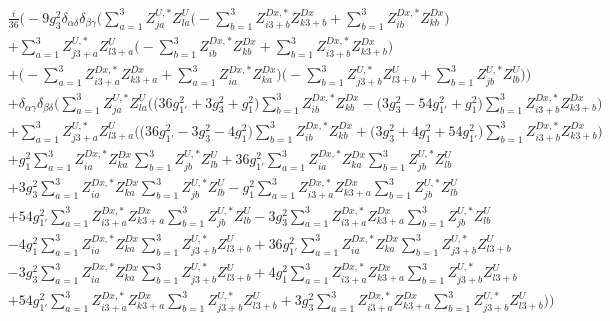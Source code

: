 \begin{align} 
 &\frac{i}{36} \Big(-9 g_{3}^{2} \delta_{\alpha \delta} \delta_{\beta \gamma} \Big(\sum_{a=1}^{3}Z^{U,*}_{j a} Z_{{l a}}^{U}  \Big(- \sum_{b=1}^{3}Z^{{Dx},*}_{i 3 + b} Z_{{k 3 + b}}^{Dx}   + \sum_{b=1}^{3}Z^{{Dx},*}_{i b} Z_{{k b}}^{Dx} \Big)\nonumber \\ 
 &+\sum_{a=1}^{3}Z^{U,*}_{j 3 + a} Z_{{l 3 + a}}^{U}  \Big(- \sum_{b=1}^{3}Z^{{Dx},*}_{i b} Z_{{k b}}^{Dx}   + \sum_{b=1}^{3}Z^{{Dx},*}_{i 3 + b} Z_{{k 3 + b}}^{Dx} \Big)\nonumber \\ 
 &+\Big(- \sum_{a=1}^{3}Z^{{Dx},*}_{i 3 + a} Z_{{k 3 + a}}^{Dx}   + \sum_{a=1}^{3}Z^{{Dx},*}_{i a} Z_{{k a}}^{Dx} \Big)\Big(- \sum_{b=1}^{3}Z^{U,*}_{j 3 + b} Z_{{l 3 + b}}^{U}   + \sum_{b=1}^{3}Z^{U,*}_{j b} Z_{{l b}}^{U} \Big)\Big)\nonumber \\ 
 &+\delta_{\alpha \gamma} \delta_{\beta \delta} \Big(\sum_{a=1}^{3}Z^{U,*}_{j a} Z_{{l a}}^{U}  \Big(\Big(36 g_{1'}^{2}  + 3 g_{3}^{2}  + g_{1}^{2}\Big)\sum_{b=1}^{3}Z^{{Dx},*}_{i b} Z_{{k b}}^{Dx}   - \Big(3 g_{3}^{2}  -54 g_{1'}^{2}  + g_{1}^{2}\Big)\sum_{b=1}^{3}Z^{{Dx},*}_{i 3 + b} Z_{{k 3 + b}}^{Dx}  \Big)\nonumber \\ 
 &+\sum_{a=1}^{3}Z^{U,*}_{j 3 + a} Z_{{l 3 + a}}^{U}  \Big(\Big(36 g_{1'}^{2}  -3 g_{3}^{2}  -4 g_{1}^{2} \Big)\sum_{b=1}^{3}Z^{{Dx},*}_{i b} Z_{{k b}}^{Dx}   + \Big(3 g_{3}^{2}  + 4 g_{1}^{2}  + 54 g_{1'}^{2} \Big)\sum_{b=1}^{3}Z^{{Dx},*}_{i 3 + b} Z_{{k 3 + b}}^{Dx}  \Big)\nonumber \\ 
 &+g_{1}^{2} \sum_{a=1}^{3}Z^{{Dx},*}_{i a} Z_{{k a}}^{Dx}  \sum_{b=1}^{3}Z^{U,*}_{j b} Z_{{l b}}^{U}  +36 g_{1'}^{2} \sum_{a=1}^{3}Z^{{Dx},*}_{i a} Z_{{k a}}^{Dx}  \sum_{b=1}^{3}Z^{U,*}_{j b} Z_{{l b}}^{U}  \nonumber \\ 
 &+3 g_{3}^{2} \sum_{a=1}^{3}Z^{{Dx},*}_{i a} Z_{{k a}}^{Dx}  \sum_{b=1}^{3}Z^{U,*}_{j b} Z_{{l b}}^{U}  - g_{1}^{2} \sum_{a=1}^{3}Z^{{Dx},*}_{i 3 + a} Z_{{k 3 + a}}^{Dx}  \sum_{b=1}^{3}Z^{U,*}_{j b} Z_{{l b}}^{U}  \nonumber \\ 
 &+54 g_{1'}^{2} \sum_{a=1}^{3}Z^{{Dx},*}_{i 3 + a} Z_{{k 3 + a}}^{Dx}  \sum_{b=1}^{3}Z^{U,*}_{j b} Z_{{l b}}^{U}  -3 g_{3}^{2} \sum_{a=1}^{3}Z^{{Dx},*}_{i 3 + a} Z_{{k 3 + a}}^{Dx}  \sum_{b=1}^{3}Z^{U,*}_{j b} Z_{{l b}}^{U}  \nonumber \\ 
 &-4 g_{1}^{2} \sum_{a=1}^{3}Z^{{Dx},*}_{i a} Z_{{k a}}^{Dx}  \sum_{b=1}^{3}Z^{U,*}_{j 3 + b} Z_{{l 3 + b}}^{U}  +36 g_{1'}^{2} \sum_{a=1}^{3}Z^{{Dx},*}_{i a} Z_{{k a}}^{Dx}  \sum_{b=1}^{3}Z^{U,*}_{j 3 + b} Z_{{l 3 + b}}^{U}  \nonumber \\ 
 &-3 g_{3}^{2} \sum_{a=1}^{3}Z^{{Dx},*}_{i a} Z_{{k a}}^{Dx}  \sum_{b=1}^{3}Z^{U,*}_{j 3 + b} Z_{{l 3 + b}}^{U}  +4 g_{1}^{2} \sum_{a=1}^{3}Z^{{Dx},*}_{i 3 + a} Z_{{k 3 + a}}^{Dx}  \sum_{b=1}^{3}Z^{U,*}_{j 3 + b} Z_{{l 3 + b}}^{U}  \nonumber \\ 
 &+54 g_{1'}^{2} \sum_{a=1}^{3}Z^{{Dx},*}_{i 3 + a} Z_{{k 3 + a}}^{Dx}  \sum_{b=1}^{3}Z^{U,*}_{j 3 + b} Z_{{l 3 + b}}^{U}  +3 g_{3}^{2} \sum_{a=1}^{3}Z^{{Dx},*}_{i 3 + a} Z_{{k 3 + a}}^{Dx}  \sum_{b=1}^{3}Z^{U,*}_{j 3 + b} Z_{{l 3 + b}}^{U}  \Big)\Big)\end{align} 
